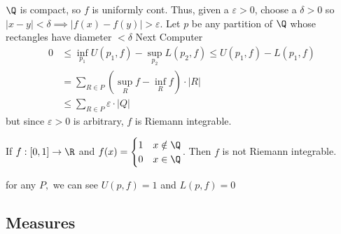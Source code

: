 \begin{solution}
	$\Q$ is compact, so  $f$ is uniformly cont. Thus, given a $\varepsilon >0 $, choose a $\delta >0$ so  $|x-y| < \delta \implies |f(x) - f(y)| > \varepsilon$. Let $p$ be any partition of  $\Q$ whose rectangles have diameter  $< \delta$ \newline
	Next Computer
	\begin{align*}
		0 &\leq \inf_{p_1} U(p_1, f) - \sup_{p_2} L(p_2, f) \leq U(p_1, f) - L(p_1, f) \\
		  &= \sum_{R \in P}^{} \left( \sup_{R} f - \inf_{R}f \right) \cdot |R| \\
		  &\leq \sum_{R \in P}^{} \varepsilon \cdot |Q|
	\end{align*}
	but since $\varepsilon > 0$ is arbitrary,  $f$ is Riemann integrable.
\end{solution}

\begin{example}
	If $f:[0,1] \to \R$ and $f(x) =
	\begin{cases}
		1 & x\notin \Q \\
		0 & x\in \Q
	\end{cases}$.
	Then $f$ is not Riemann integrable. \\
	\begin{solution}
		for any $P,$ we can see  $U(p,f) = 1$ and  $L(p,f) = 0$
	\end{solution}
\end{example}

\subsection{Measures}

